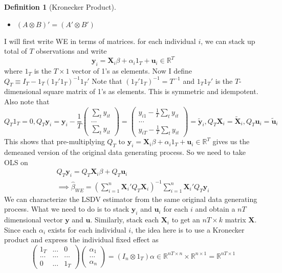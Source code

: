 \documentclass[12pt]{article}
\theoremstyle{definition}
\newtheorem{definition}{Definition}[section]
\theoremstyle{property}
\theoremstyle{assumption}
\theoremstyle{example}
\theoremstyle{comment}
\begin{document}
\begin{itemize}
\begin{mdframed}[backgroundcolor=blue!5]
\begin{definition}[Kronecker Product]
\begin{itemize}
\item $(A\otimes B)'= (A'\otimes B')$
\end{itemize}
\end{definition}
\end{mdframed}\par
I will first write WE in terms of matrices. for each individual $i$, we can stack up total of $T$ observations and write
\[
\mathbf{y}_i =\mathbf{X}_i\beta + \alpha_i 1_T +\mathbf{u}_i \in \mathbb{R}^T 
\]
where $1_T$ is the $T\times 1$ vector of 1's as elements. Now I define $Q_T\equiv I_T-1_T(1_T'1_T)^{-1}1_T'$ Note that $(1_T'1_T)^{-1}=T^{-1}$ and $1_T1_T'$ is the $T$-dimensional square matrix of 1's as elements. This is symmetric and idempotent. Also note that 
\[
Q_T1_T =0, Q_T\mathbf{y}_i=\mathbf{y}_i-\frac{1}{T}\begin{pmatrix}\sum_t y_{it}\\ ...\\\sum_t y_{it}\end{pmatrix}=\begin{pmatrix}y_{i1}-\frac{1}{T}\sum_t y_{it}\\ ... \\y_{iT}-\frac{1}{T}\sum_t y_{it}\end{pmatrix}=\mathbf{\tilde{y}}_i, Q_T\mathbf{X}_i = \mathbf{\tilde{X}}_i,Q_T\mathbf{u}_i = \mathbf{\tilde{u}}_i
\]
This shows that pre-multiplying $Q_T$ to $\mathbf{y}_i =\mathbf{X}_i\beta + \alpha_i 1_T +\mathbf{u}_i \in \mathbb{R}^T $ gives us the demeaned version of the original data generating process. So we need to take OLS on
\begin{gather*}
Q_T\mathbf{y}_i=Q_T\mathbf{X}_i\beta+ Q_T\mathbf{u}_i\\
\implies \hat{\beta}_{WE}=\left(\sum_{i=1}^n\mathbf{X}_i'Q_T\mathbf{X}_i\right)^{-1}\sum_{i=1}^n\mathbf{X}_i'Q_T\mathbf{y}_i
\end{gather*}
We can characterize the LSDV estimator from the same original data generating process. What we need to do is to stack $\mathbf{y}_i$ and $\mathbf{u}_i$  for each $i$ and obtain a $nT$ dimensional vector $\mathbf{y}$ and $\mathbf{u}$. Similarly, stack each $\mathbf{X}_i$ to get an $nT\times k$ matrix $\mathbf{X}$. Since each $\alpha_i$ exists for each individual $i$, the idea here is to use a Kronecker product and express the individual fixed effect as
\[
\begin{pmatrix}1_T &...& 0 \\ ... &...&...\\ 0&...& 1_T \end{pmatrix}\begin{pmatrix}\alpha_1\\ ...\\ \alpha_n \end{pmatrix}=(I_n\otimes 1_T)\alpha\in\mathbb{R}^{nT\times n}\times \mathbb{R}^{n\times 1}=\mathbb{R}^{nT\times 1}
\]
\end{itemize}
\end{document}

